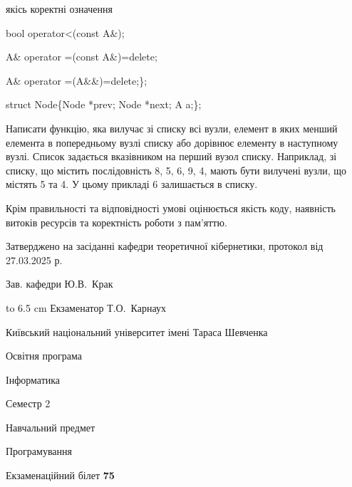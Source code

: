 \documentclass[12pt, ukrainian]{article}
\begin{document}
{\quad  якісь коректні означення 

\quad  bool operator<(const A\&); 

\quad A\& operator =(const A\&)=delete; 

\quad  A\& operator =(A\&\&)=delete;\};

struct Node\{Node *prev; Node *next; A a;\};

Написати функцію, яка вилучає зі списку всі вузли, елемент в яких менший елемента в попередньому вузлі списку або дорівнює елементу в наступному вузлі. Список задається вказівником на перший вузол списку. Наприклад, зі списку, що містить послідовність 8, 5, 6, 9, 4, мають бути вилучені вузли, що містять 5 та 4. У цьому прикладі 6 залишається в списку.

Крім правильності та відповідності умові оцінюється якість коду, наявність витоків ресурсів та коректність роботи з пам'яттю. 

}
{\smallskip\smallskip \begin {scriptsize} Затверджено на засіданні кафедри теоретичної кібернетики, протокол   від   27.03.2025 р.\par\smallskip\smallskip\smallskip\smallskip
{\parbox {6.5 cm} {Зав. кафедри \dotfill Ю.В.~Крак}}\hspace {0.7cm} {\hbox to 6.5 cm { Екзаменатор \dotfill Т.О.~Карнаух}} \end{scriptsize}}
\newpage
{{\begin {scriptsize}\par
{ \center  Київський національний університет імені Тараса Шевченка \par}
{\parbox {5 cm}{Освітня програма \hfill}{\parbox {7 cm}{Інформатика\hfill}}\parbox {6 cm}{\hfill Семестр 2}}\par
{\parbox {5 cm} {Навчальний предмет \hfill}\parbox {7 cm}{Програмування \hfill}\parbox {6cm}{\hfill}\par}\vspace{-15pt} \end{scriptsize}}{\center Екзаменаційний білет \No \textbf { 75 }\par}}
\end{document}
